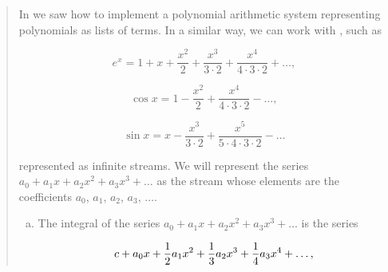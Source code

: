 \begin{quote}
 In  we saw how
to implement a polynomial arithmetic system representing polynomials as lists
of terms.  In a similar way, we can work with , such as
\begin{comment}

\begin{example}
               x^2     x^3       x^4
e^x = 1 + x + ----- + ----- + --------- + ...
                2     3 * 2   4 * 3 * 2

             x^2       x^4
cos x = 1 - ----- + --------- - ...
              2     4 * 3 * 2

             x^3         x^5
sin x = x - ----- + ------------- - ...
            3 * 2   5 * 4 * 3 * 2
\end{example}

\end{comment}

$$
e^x = 1 + x + \displaystyle\frac{x^2}{2} + \displaystyle\frac{x^3}{3 \cdot 2} + \displaystyle\frac{x^4}{4 \cdot 3 \cdot 2} + \dots,
$$


$$
\cos x = 1 - \displaystyle\frac{x^2}{2} + \displaystyle\frac{x^4}{4 \cdot 3 \cdot 2} - \dots,
$$


$$
\sin x = x - \displaystyle\frac{x^3}{3 \cdot 2} + \displaystyle\frac{x^5}{5 \cdot 4 \cdot 3 \cdot 2} - \dots
$$

\noindent
represented as infinite streams.  We will represent the series \( a_0 +
a_1 x + a_2 x^2 + a_3 x^3 + \dots \) as the stream whose
elements are the coefficients \( a_0 \), \( a_1 \), \( a_2 \), \( a_3 \), \( \dots \).

\begin{enumerate}[a.]

\item
The integral of the series \( a_0 + a_1 x + a_2 x^2 + a_3 x^3 + \dots \) is the series
\begin{comment}

\begin{example}
             1             1             1
c + a_0 x + --- a_1 x^2 + --- a_2 x^3 + --- a_3 x^4 + ...
             2             3             4
\end{example}

\end{comment}

$$ c + a_0 x + {1\over2} a_1 x^2 + {1\over3} a_2 x^3 + {1\over4} a_3 x^4 + \dots, $$


\end{enumerate}
\end{quote}
